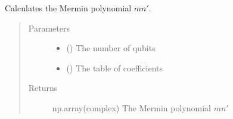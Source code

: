 \documentclass[letterpaper,10pt,english]{sphinxmanual}
\begin{document}
\begin{fulllineitems}
\label{\detokenize{mermin_polynomials-opti:mermin_on_qiskit.hypergraphstates_optimization.mermin_polynomials.mermin_prime}}
Calculates the Mermin polynomial \(mn'\).
\begin{quote}\begin{description}
\item[{Parameters}] \leavevmode\begin{itemize}
\item {} 
 () \textendash{} The number of qubits

\item {} 
 (\sphinxstyleliteralemphasis{\sphinxupquote{(}}\sphinxstyleliteralemphasis{\sphinxupquote{(}}\sphinxstyleliteralemphasis{\sphinxupquote{)}}\sphinxstyleliteralemphasis{\sphinxupquote{)}}) \textendash{} The table of coefficients

\end{itemize}

\item[{Returns}] \leavevmode
np.array(complex) \textendash{} The Mermin polynomial \(mn'\)

\end{description}\end{quote}

\end{fulllineitems}

\end{document}
